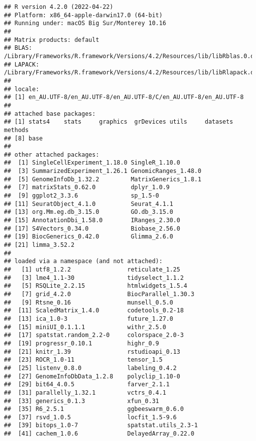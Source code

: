 \documentclass[
  openany]{book}
\begin{document}
\begin{verbatim}
## R version 4.2.0 (2022-04-22)
## Platform: x86_64-apple-darwin17.0 (64-bit)
## Running under: macOS Big Sur/Monterey 10.16
## 
## Matrix products: default
## BLAS:   /Library/Frameworks/R.framework/Versions/4.2/Resources/lib/libRblas.0.dylib
## LAPACK: /Library/Frameworks/R.framework/Versions/4.2/Resources/lib/libRlapack.dylib
## 
## locale:
## [1] en_AU.UTF-8/en_AU.UTF-8/en_AU.UTF-8/C/en_AU.UTF-8/en_AU.UTF-8
## 
## attached base packages:
## [1] stats4    stats     graphics  grDevices utils     datasets  methods  
## [8] base     
## 
## other attached packages:
##  [1] SingleCellExperiment_1.18.0 SingleR_1.10.0             
##  [3] SummarizedExperiment_1.26.1 GenomicRanges_1.48.0       
##  [5] GenomeInfoDb_1.32.2         MatrixGenerics_1.8.1       
##  [7] matrixStats_0.62.0          dplyr_1.0.9                
##  [9] ggplot2_3.3.6               sp_1.5-0                   
## [11] SeuratObject_4.1.0          Seurat_4.1.1               
## [13] org.Mm.eg.db_3.15.0         GO.db_3.15.0               
## [15] AnnotationDbi_1.58.0        IRanges_2.30.0             
## [17] S4Vectors_0.34.0            Biobase_2.56.0             
## [19] BiocGenerics_0.42.0         Glimma_2.6.0               
## [21] limma_3.52.2               
## 
## loaded via a namespace (and not attached):
##   [1] utf8_1.2.2                reticulate_1.25          
##   [3] lme4_1.1-30               tidyselect_1.1.2         
##   [5] RSQLite_2.2.15            htmlwidgets_1.5.4        
##   [7] grid_4.2.0                BiocParallel_1.30.3      
##   [9] Rtsne_0.16                munsell_0.5.0            
##  [11] ScaledMatrix_1.4.0        codetools_0.2-18         
##  [13] ica_1.0-3                 future_1.27.0            
##  [15] miniUI_0.1.1.1            withr_2.5.0              
##  [17] spatstat.random_2.2-0     colorspace_2.0-3         
##  [19] progressr_0.10.1          highr_0.9                
##  [21] knitr_1.39                rstudioapi_0.13          
##  [23] ROCR_1.0-11               tensor_1.5               
##  [25] listenv_0.8.0             labeling_0.4.2           
##  [27] GenomeInfoDbData_1.2.8    polyclip_1.10-0          
##  [29] bit64_4.0.5               farver_2.1.1             
##  [31] parallelly_1.32.1         vctrs_0.4.1              
##  [33] generics_0.1.3            xfun_0.31                
##  [35] R6_2.5.1                  ggbeeswarm_0.6.0         
##  [37] rsvd_1.0.5                locfit_1.5-9.6           
##  [39] bitops_1.0-7              spatstat.utils_2.3-1     
##  [41] cachem_1.0.6              DelayedArray_0.22.0      

\end{verbatim}
\end{document}
